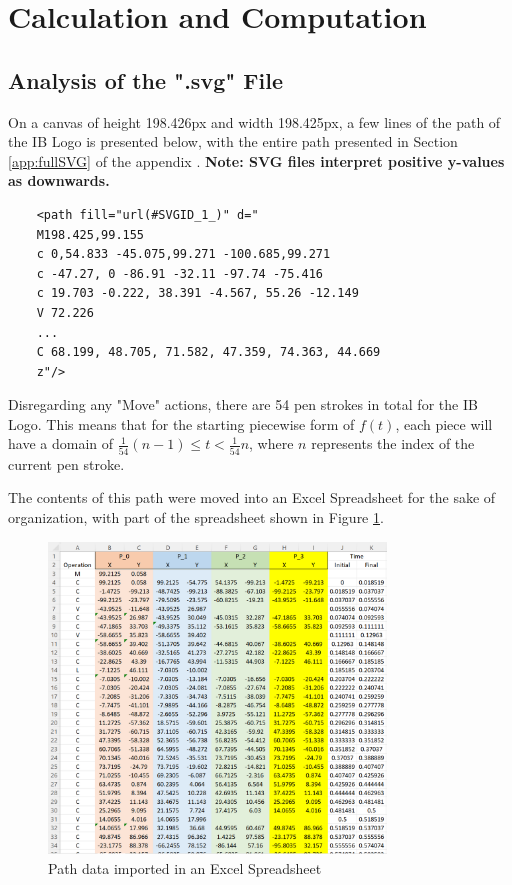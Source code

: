 \documentclass[letterpaper, 12pt]{article}
\begin{document}
\section{Calculation and Computation}

\subsection{Analysis of the ".svg" File} \label{svgAnalysis}

On a canvas of height 198.426px and width 198.425px,
a few lines of the path of the IB Logo is presented below,
with the entire path presented in Section \ref*{app:fullSVG}
of the appendix
\cite{internationalbaccalaureateorganisationInternationalBaccalaureateLogo2013}. \textbf{Note: SVG files interpret positive y-values as downwards.}

\begin{verbatim}
    <path fill="url(#SVGID_1_)" d="
    M198.425,99.155
    c 0,54.833 -45.075,99.271 -100.685,99.271
    c -47.27, 0 -86.91 -32.11 -97.74 -75.416
    c 19.703 -0.222, 38.391 -4.567, 55.26 -12.149
    V 72.226
    ...
    C 68.199, 48.705, 71.582, 47.359, 74.363, 44.669
    z"/>
\end{verbatim}

Disregarding any "Move" actions, there are 54 pen strokes
in total for the IB Logo. This means that for the starting piecewise
form of \(f(t)\), each piece will have a domain of \(\frac{1}{54}(n-1) \le t < \frac{1}{54}n\),
where \(n\) represents the index of the current pen stroke.

The contents of this path were moved into an Excel Spreadsheet for
the sake of organization, with part of the spreadsheet shown
in Figure \ref*{fig:svgxlsx}.

\begin{figure}[H]
    \centering
    \includegraphics[width=0.8\textwidth]{svgxlsx.png}
    \caption{Path data imported in an Excel Spreadsheet}
    \label{fig:svgxlsx}
\end{figure}
\end{document}
